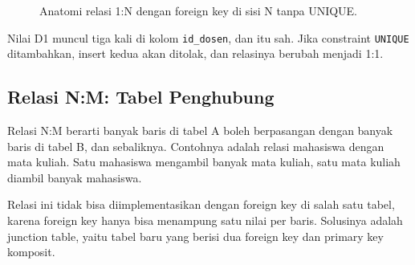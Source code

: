 \documentclass[11pt,a4paper]{article}
\begin{document}
\begin{figure}[H]
	\centering
	\caption{Anatomi relasi 1:N dengan foreign key di sisi N tanpa UNIQUE.}
	\label{fig:one-n}
\end{figure}

Nilai D1 muncul tiga kali di kolom \texttt{id\_dosen}, dan itu sah. Jika constraint \texttt{UNIQUE} ditambahkan, insert kedua akan ditolak, dan relasinya berubah menjadi 1:1.

\subsection{Relasi N:M: Tabel Penghubung}

Relasi N:M berarti banyak baris di tabel A boleh berpasangan dengan banyak baris di tabel B, dan sebaliknya. Contohnya adalah relasi mahasiswa dengan mata kuliah. Satu mahasiswa mengambil banyak mata kuliah, satu mata kuliah diambil banyak mahasiswa.

Relasi ini tidak bisa diimplementasikan dengan foreign key di salah satu tabel, karena foreign key hanya bisa menampung satu nilai per baris. Solusinya adalah junction table, yaitu tabel baru yang berisi dua foreign key dan primary key komposit.
\end{document}
